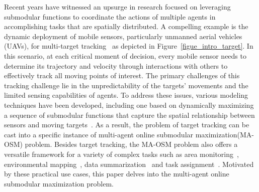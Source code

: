  Recent years have witnessed an upsurge in research focused on leveraging submodular functions to coordinate the actions of multiple agents in accomplishing tasks that are spatially distributed. A compelling example is the dynamic deployment of mobile sensors, particularly unmanned aerial vehicles (UAVs), for multi-target tracking~\citep{zhou2018resilient,corah2021scalable} as depicted in Figure~\ref{figue_intro_target}. In this scenario, at each critical moment of decision, every mobile sensor needs to determine its trajectory and velocity through interactions with others to effectively track all moving points of interest. The primary challenges of this tracking challenge lie in the unpredictability of the targets' movements and the limited sensing capabilities of agents. To address these issues, various modeling techniques have been developed, including one based on dynamically maximizing a sequence of submodular functions that capture the spatial relationship between sensors and moving targets~\citep{xu2023online,rezazadeh2023distributed,robey2021optimal}. As a result, the problem of target tracking can be cast into a specific instance of multi-agent online submodular maximization(MA-OSM) problem. Besides target tracking, the MA-OSM problem also offers a versatile framework for a variety of complex tasks such as area monitoring~\citep{schlotfeldt2021resilient,li2023submodularity}, environmental mapping~\citep{atanasov2015decentralized,liu2021distributed}, data summarization~\citep{mirzasoleiman2016fast,mirzasoleiman2016distributed} and task assignment~\citep{qu2019distributed}.  Motivated by these practical use cases, this paper delves into the multi-agent online submodular maximization problem.

